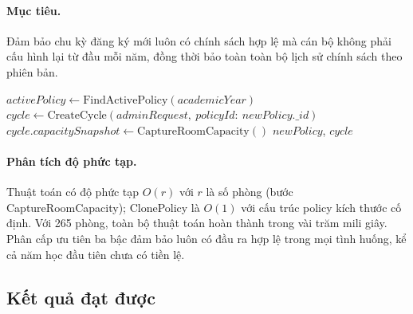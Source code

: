 \documentclass[../DoAn.tex]{subfiles}
\begin{document}
\begin{minipage}{\linewidth}
\paragraph{Mục tiêu.}
Đảm bảo chu kỳ đăng ký mới luôn có chính sách hợp lệ mà cán bộ không phải
cấu hình lại từ đầu mỗi năm, đồng thời bảo toàn toàn bộ lịch sử chính sách
theo phiên bản.

\begin{algorithm}[H]
\small
\caption{\textit{PolicyInheritanceAndActivation}}
$activePolicy \leftarrow \text{FindActivePolicy}(academicYear)$\;
$cycle \leftarrow \text{CreateCycle}(adminRequest,\ policyId{:}\ newPolicy.\_id)$\;
$cycle.capacitySnapshot \leftarrow \text{CaptureRoomCapacity}()$\;
\KwReturn $newPolicy$, $cycle$\;
\end{algorithm}
\end{minipage}

\medskip
\paragraph{Phân tích độ phức tạp.}
Thuật toán có độ phức tạp $O(r)$ với $r$ là số phòng (bước CaptureRoomCapacity);
ClonePolicy là $O(1)$ với cấu trúc policy kích thước cố định. Với 265 phòng,
toàn bộ thuật toán hoàn thành trong vài trăm mili giây. Phân cấp ưu tiên ba
bậc đảm bảo luôn có đầu ra hợp lệ trong mọi tình huống, kể cả năm học đầu
tiên chưa có tiền lệ.

\subsection{Kết quả đạt được}
\label{subsec:policy_result}
\end{document}
